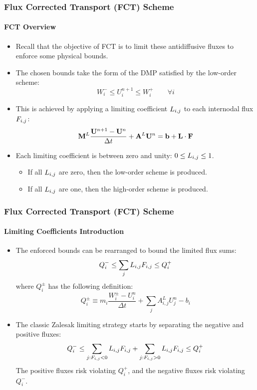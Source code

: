 \documentclass{beamer}
\begin{document}
\begin{frame}
\frametitle{Flux Corrected Transport (FCT) Scheme}
\framesubtitle{FCT Overview}

\begin{itemize}
   \item Recall that the objective of FCT is to limit these antidiffusive
      fluxes to enforce some physical bounds.
   \item The chosen bounds take the form of the DMP satisfied by the
      low-order scheme:
      \begin{equation}
         W_i^-\leq
         U_i^{n+1}\leq
         W_i^+\qquad\forall i
      \end{equation}
   \item This is achieved by applying a limiting coefficient $L_{i,j}$ to each
      internodal flux $F_{i,j}$:
      \begin{equation}
         \mathbf{M}^L\frac{\mathbf{U}^{n+1}-\mathbf{U}^n}{\Delta t} + \mathbf{A}^L\mathbf{U}^n = \mathbf{b} + \mathbf{L}\cdot\mathbf{F}
      \end{equation}
   \item Each limiting coefficient is between zero and unity: $0\leq L_{i,j}\leq 1$.
   \begin{itemize}
      \item If all $L_{i,j}$ are zero, then the low-order scheme is produced.
      \item If all $L_{i,j}$ are one, then the high-order scheme is produced.
   \end{itemize}
\end{itemize}

\end{frame}
\begin{frame}
\frametitle{Flux Corrected Transport (FCT) Scheme}
\framesubtitle{Limiting Coefficients Introduction}

\begin{itemize}
   \item The enforced bounds can be rearranged to bound the limited flux sums:
      \begin{equation}
         Q^-_i \leq \sum\limits_j L_{i,j} F_{i,j} \leq Q^+_i
      \end{equation}
      where $Q_i^\pm$ has the following definition:
      \begin{equation}
         Q_i^\pm \equiv m_i\frac{W_i^\pm-U_i^n}{\Delta t}
         + \sum\limits_j A_{i,j}^L U_j^n - b_i
      \end{equation}
   \item The classic Zalesak limiting strategy starts by separating the
      negative and positive fluxes:
      \begin{equation}
         Q^-_i \leq \sum\limits_{j:F_{i,j}<0} L_{i,j} F_{i,j} +
            \sum\limits_{j:F_{i,j}>0} L_{i,j} F_{i,j}\leq Q^+_i
      \end{equation}
      The positive fluxes risk violating $Q_i^+$, and the negative fluxes risk
      violating $Q_i^-$.
\end{itemize}

\end{frame}
\end{document}
